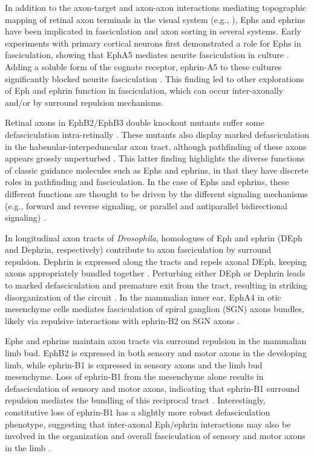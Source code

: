 \label{sec:EphFascic}
In addition to the axon-target and axon-axon interactions mediating topographic mapping of retinal axon terminals in the visual system (e.g., ), Ephs and ephrins have been implicated in fasciculation and axon sorting in several systems.
Early \invitro{} experiments with primary cortical neurons first demonstrated a role for Ephs in fasciculation, showing that EphA5 mediates neurite fasciculation in culture \cite{winslow1995cloning}.
Adding a soluble form of the cognate receptor, ephrin-A5 to these cultures significantly blocked neurite fasciculation \cite{winslow1995cloning}.
This finding led to other explorations of Eph and ephrin function in fasciculation, which can occur inter-axonally and/or by surround repulsion mechanisms.

Retinal axons in EphB2/EphB3 double knockout mutants suffer some defasciculation intra-retinally \cite{birgbauer2000kinase}.
These mutants also display marked defasciculation in the habenular-interpeduncular axon tract, although pathfinding of these axons appears grossly unperturbed \cite{orioli1996sek4}.
This latter finding highlights the diverse functions of classic guidance molecules such as Ephs and ephrins, in that they have discrete roles in pathfinding and fasciculation.
In the case of Ephs and ephrins, these different functions are thought to be driven by the different signaling mechanisms (e.g., forward and reverse signaling, or parallel and antiparallel bidirectional signaling) \cite{egea2007bidirectional,kania2016mechanisms}.

In longitudinal axon tracts of \emph{Drosophila}, homologues of Eph and ephrin (DEph and Dephrin, respectively) contribute to axon fasciculation by surround repulsion.
Dephrin is expressed along the tracts and repels axonal DEph, keeping axons appropriately bundled together \cite{bossing2002dephrin}.
Perturbing either DEph or Dephrin leads to marked defasciculation and premature exit from the tract, resulting in striking disorganization of the circuit \cite{bossing2002dephrin}.
In the mammalian inner ear, EphA4 in otic mesenchyme cells mediates fasciculation of spiral ganglion (SGN) axons bundles, likely via repulsive interactions with ephrin-B2 on SGN axons \cite{coate2012otic}.

Ephs and ephrins maintain axon tracts via surround repulsion in the mammalian limb bud.
EphB2 is expressed in both sensory and motor axons in the developing limb, while ephrin-B1 is expressed in sensory axons and the limb bud mesenchyme.
Loss of ephrin-B1 from the mesenchyme alone results in defasciculation of sensory and motor axons, indicating that ephrin-B1 surround repulsion mediates the bundling of this reciprocal tract \cite{luxey2013eph}.
Interestingly, constitutive loss of ephrin-B1 has a slightly more robust defasciculation phenotype, suggesting that inter-axonal Eph/ephrin interactions may also be involved in the organization and overall fasciculation of sensory and motor axons in the limb \cite{luxey2013eph}.

